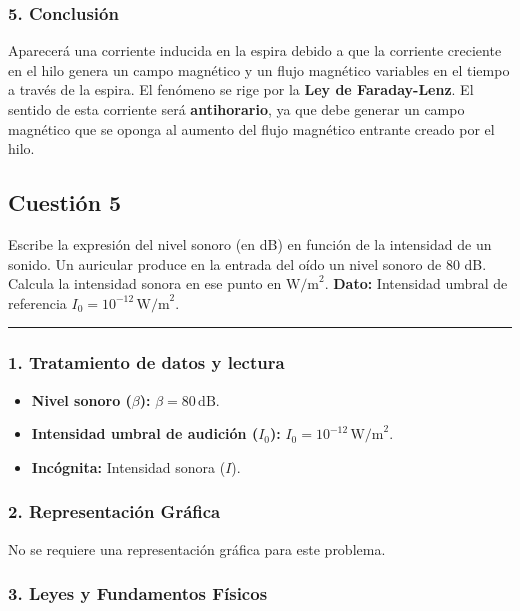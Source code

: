 \subsubsection*{5. Conclusión}
\begin{cajaconclusion}
Aparecerá una corriente inducida en la espira debido a que la corriente creciente en el hilo genera un campo magnético y un flujo magnético variables en el tiempo a través de la espira. El fenómeno se rige por la \textbf{Ley de Faraday-Lenz}. El sentido de esta corriente será \textbf{antihorario}, ya que debe generar un campo magnético que se oponga al aumento del flujo magnético entrante creado por el hilo.
\end{cajaconclusion}

\newpage
\subsection{Cuestión 5}
\label{subsec:C5_2021_jul_ext}

\begin{cajaenunciado}
Escribe la expresión del nivel sonoro (en dB) en función de la intensidad de un sonido. Un auricular produce en la entrada del oído un nivel sonoro de 80 dB. Calcula la intensidad sonora en ese punto en $\text{W/m}^2$.
\textbf{Dato:} Intensidad umbral de referencia $I_0=10^{-12}\,\text{W/m}^2$.
\end{cajaenunciado}
\hrule

\subsubsection*{1. Tratamiento de datos y lectura}
\begin{itemize}
    \item \textbf{Nivel sonoro ($\beta$):} $\beta = 80 \, \text{dB}$.
    \item \textbf{Intensidad umbral de audición ($I_0$):} $I_0 = 10^{-12} \, \text{W/m}^2$.
    \item \textbf{Incógnita:} Intensidad sonora ($I$).
\end{itemize}

\subsubsection*{2. Representación Gráfica}
No se requiere una representación gráfica para este problema.

\subsubsection*{3. Leyes y Fundamentos Físicos}
